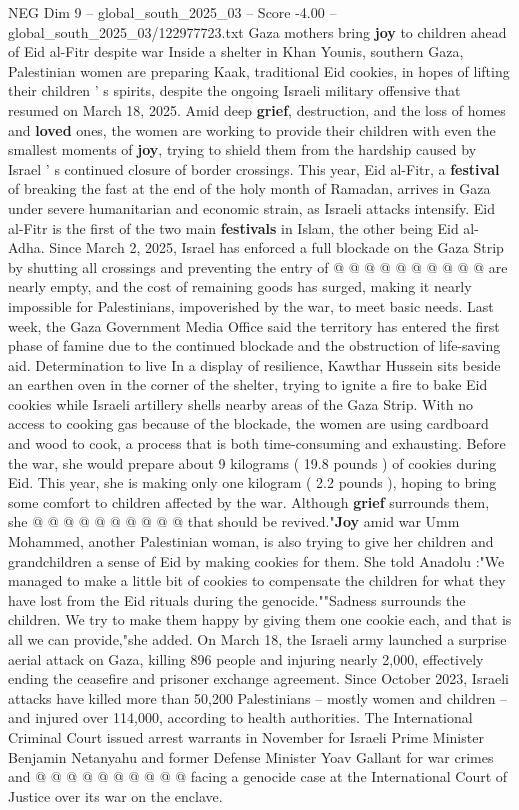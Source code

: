 \begin{textsample}{NEG Dim 9 – global\_south\_2025\_03 – Score -4.00 – global\_south\_2025\_03/122977723.txt}  \label{ex:f9_neg_398}
Gaza mothers bring \textbf{joy} to children ahead of Eid al-Fitr despite war Inside a shelter in Khan Younis, southern Gaza, Palestinian women are preparing Kaak, traditional Eid cookies, in hopes of lifting their children ' s spirits, despite the ongoing Israeli military offensive that resumed on March 18, 2025.
Amid deep \textbf{grief}, destruction, and the loss of homes and \textbf{loved} ones, the women are working to provide their children with even the smallest moments of \textbf{joy}, trying to shield them from the hardship caused by Israel ' s continued closure of border crossings.
This year, Eid al-Fitr, a \textbf{festival} of breaking the fast at the end of the holy month of Ramadan, arrives in Gaza under severe humanitarian and economic strain, as Israeli attacks intensify.
Eid al-Fitr is the first of the two main \textbf{festivals} in Islam, the other being Eid al-Adha.
Since March 2, 2025, Israel has enforced a full blockade on the Gaza Strip by shutting all crossings and preventing the entry of @ @ @ @ @ @ @ @ @ @ are nearly empty, and the cost of remaining goods has surged, making it nearly impossible for Palestinians, impoverished by the war, to meet basic needs.
Last week, the Gaza Government Media Office said the territory has entered the first phase of famine due to the continued blockade and the obstruction of life-saving aid.
Determination to live In a display of resilience, Kawthar Hussein sits beside an earthen oven in the corner of the shelter, trying to ignite a fire to bake Eid cookies while Israeli artillery shells nearby areas of the Gaza Strip.
With no access to cooking gas because of the blockade, the women are using cardboard and wood to cook, a process that is both time-consuming and exhausting.
Before the war, she would prepare about 9 kilograms ( 19.8 pounds ) of cookies during Eid.
This year, she is making only one kilogram ( 2.2 pounds ), hoping to bring some comfort to children affected by the war.
Although \textbf{grief} surrounds them, she @ @ @ @ @ @ @ @ @ @ that should be revived."\textbf{Joy} amid war Umm Mohammed, another Palestinian woman, is also trying to give her children and grandchildren a sense of Eid by making cookies for them.
She told Anadolu :"We managed to make a little bit of cookies to compensate the children for what they have lost from the Eid rituals during the genocide.""Sadness surrounds the children.
We try to make them happy by giving them one cookie each, and that is all we can provide,"she added.
On March 18, the Israeli army launched a surprise aerial attack on Gaza, killing 896 people and injuring nearly 2,000, effectively ending the ceasefire and prisoner exchange agreement.
Since October 2023, Israeli attacks have killed more than 50,200 Palestinians -- mostly women and children -- and injured over 114,000, according to health authorities.
The International Criminal Court issued arrest warrants in November for Israeli Prime Minister Benjamin Netanyahu and former Defense Minister Yoav Gallant for war crimes and @ @ @ @ @ @ @ @ @ @ facing a genocide case at the International Court of Justice over its war on the enclave.

\end{textsample}
